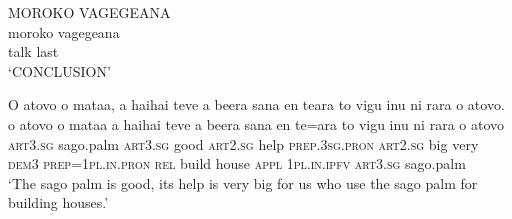\ea\label{ex:text2-53}
MOROKO VAGEGEANA\\
\gll moroko	vagegeana\\
     talk	last\\
\glt `CONCLUSION'
\z

\ea\label{ex:text2-54}
O atovo o mataa, a haihai teve a beera sana en teara to vigu inu ni rara o atovo.\\
\gll o	atovo	o	mataa	a	haihai	teve	a	beera	sana	en	te=ara	to	vigu	inu	ni	rara	o	atovo\\
     \textsc{art}3.\textsc{sg}	sago.palm	\textsc{art}3.\textsc{sg}	good	\textsc{art}2.\textsc{sg}	help	\textsc{prep}.3\textsc{sg}.\textsc{pron}	\textsc{art}2.\textsc{sg}	big	very	\textsc{dem}3	\textsc{prep}=1\textsc{pl}.\textsc{in}.\textsc{pron}	\textsc{rel}	build	house	\textsc{appl}	1\textsc{pl}.\textsc{in}.\textsc{ipfv}	\textsc{art}3.\textsc{sg}	sago.palm\\
\glt `The sago palm is good, its help is very big for us who use the sago palm for building houses.'
\z
